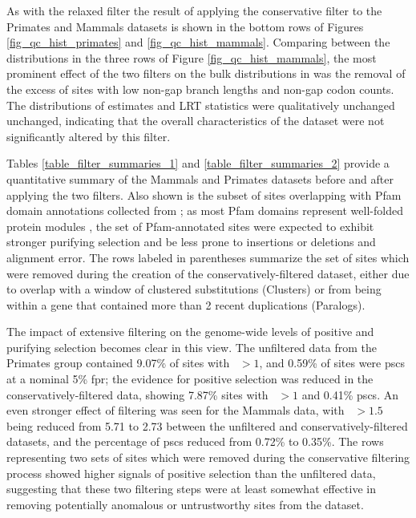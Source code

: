 As with the relaxed filter
the result of
applying the conservative filter to the Primates and Mammals datasets is shown in
the bottom rows of Figures \ref{fig_qc_hist_primates} and
\ref{fig_qc_hist_mammals}. Comparing between the distributions in the three rows of Figure
\ref{fig_qc_hist_mammals}, the most prominent effect of the two
filters on the bulk distributions in was the removal of the excess of
sites with low non-gap branch lengths and non-gap codon counts. The
distributions of \omgml estimates and LRT statistics were
qualitatively unchanged unchanged, indicating that the overall
characteristics of the dataset were not significantly altered by this
filter.

Tables \ref{table_filter_summaries_1} and
\ref{table_filter_summaries_2} provide a quantitative summary of the
Mammals and Primates datasets before and after applying the two
filters. Also shown is the subset of sites overlapping with Pfam
domain annotations collected from \ens; as most Pfam domains represent
well-folded protein modules \citep{Finn2010}, the set of
Pfam-annotated sites were expected to exhibit stronger purifying
selection and be less prone to insertions or deletions and alignment
error. The rows labeled in parentheses summarize the set of sites
which were removed during the creation of the conservatively-filtered
dataset, either due to overlap with a window of clustered
substitutions (Clusters) or from being within a gene that contained
more than 2 recent duplications (Paralogs).

The impact of extensive filtering on the genome-wide levels of
positive and purifying selection becomes clear in this view. The
unfiltered data from the Primates group contained 9.07\% of sites with
\omgml~$>1$, and 0.59\% of sites were \acp{psc} at a nominal 5\%
\ac{fpr}; the evidence for positive selection was reduced in the
conservatively-filtered data, showing 7.87\% sites with \omgml~$>1$
and 0.41\% \acp{psc}. An even stronger effect of filtering was seen
for the Mammals data, with \omgml~$>1.5$ being reduced from 5.71 to
2.73 between the unfiltered and conservatively-filtered datasets, and
the percentage of \acp{psc} reduced from 0.72\% to 0.35\%. The rows
representing two sets of sites which were removed during the
conservative filtering process showed higher signals of positive
selection than the unfiltered data, suggesting that these two
filtering steps were at least somewhat effective in removing
potentially anomalous or untrustworthy sites from the dataset.

